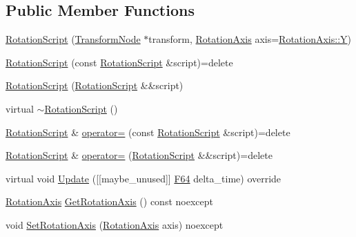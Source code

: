 \subsection*{Public Member Functions}
\begin{DoxyCompactItemize}
\item 
\hyperlink{classmage_1_1script_1_1_rotation_script_a870ce473cef6f06d0e91d5af4c38b7f0}{Rotation\+Script} (\hyperlink{classmage_1_1_transform_node}{Transform\+Node} $\ast$transform, \hyperlink{classmage_1_1script_1_1_rotation_script_aa8a91cc8c771fc777ffb5e8a28c43ad2}{Rotation\+Axis} axis=\hyperlink{classmage_1_1script_1_1_rotation_script_aa8a91cc8c771fc777ffb5e8a28c43ad2a57cec4137b614c87cb4e24a3d003a3e0}{Rotation\+Axis\+::Y})
\item 
\hyperlink{classmage_1_1script_1_1_rotation_script_a6664052bafe09a6a09734f66d9a68fe9}{Rotation\+Script} (const \hyperlink{classmage_1_1script_1_1_rotation_script}{Rotation\+Script} \&script)=delete
\item 
\hyperlink{classmage_1_1script_1_1_rotation_script_af7391c2e1495efa1b913df7a77a97e15}{Rotation\+Script} (\hyperlink{classmage_1_1script_1_1_rotation_script}{Rotation\+Script} \&\&script)
\item 
virtual \hyperlink{classmage_1_1script_1_1_rotation_script_a7deb74070c49b78b0b91e3599ee8a0b7}{$\sim$\+Rotation\+Script} ()
\item 
\hyperlink{classmage_1_1script_1_1_rotation_script}{Rotation\+Script} \& \hyperlink{classmage_1_1script_1_1_rotation_script_afa4e9fcddf4f20f6c471dfd5fed1610f}{operator=} (const \hyperlink{classmage_1_1script_1_1_rotation_script}{Rotation\+Script} \&script)=delete
\item 
\hyperlink{classmage_1_1script_1_1_rotation_script}{Rotation\+Script} \& \hyperlink{classmage_1_1script_1_1_rotation_script_a72642ac8b1f210ab4eb7feb67238a1bb}{operator=} (\hyperlink{classmage_1_1script_1_1_rotation_script}{Rotation\+Script} \&\&script)=delete
\item 
virtual void \hyperlink{classmage_1_1script_1_1_rotation_script_a868768482599b478e8fd8afe371b6c54}{Update} (\mbox{[}\mbox{[}maybe\+\_\+unused\mbox{]}\mbox{]} \hyperlink{namespacemage_ad26233bbec640deda836e572c1a23708}{F64} delta\+\_\+time) override
\item 
\hyperlink{classmage_1_1script_1_1_rotation_script_aa8a91cc8c771fc777ffb5e8a28c43ad2}{Rotation\+Axis} \hyperlink{classmage_1_1script_1_1_rotation_script_ac2ef46249d59b379f47336eb250f3a28}{Get\+Rotation\+Axis} () const noexcept
\item 
void \hyperlink{classmage_1_1script_1_1_rotation_script_aa4b49dc5e34da3e851d5aefc4c4a434b}{Set\+Rotation\+Axis} (\hyperlink{classmage_1_1script_1_1_rotation_script_aa8a91cc8c771fc777ffb5e8a28c43ad2}{Rotation\+Axis} axis) noexcept
\end{DoxyCompactItemize}
